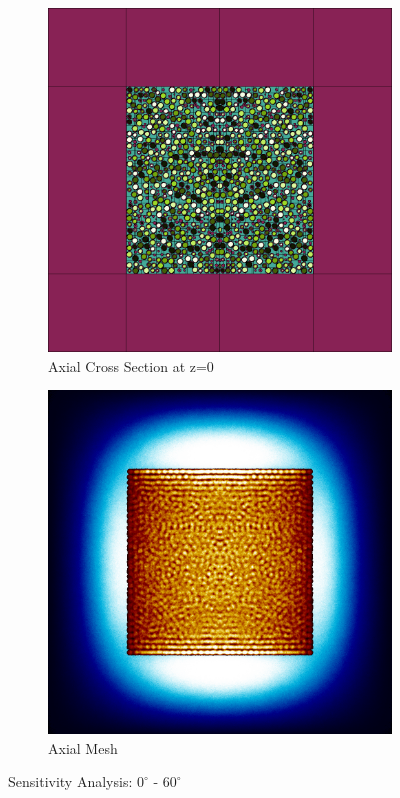 \begin{figure}[H]
\begin{subfigure}{0.45\textwidth}
  \includegraphics[width=0.95\linewidth]{figures/0-60/0-60-v}
  \caption{Axial Cross Section at z=0 }
  \label{fig:0-60-v}
\end{subfigure}
%
\begin{subfigure}{0.45\textwidth}
  \includegraphics[width=0.95\linewidth]{figures/0-60/0-60-vm}
  \caption{Axial Mesh}
  \label{fig:0-60-vm}
\end{subfigure}
%
\caption{Sensitivity Analysis: $0^{\circ}$ - $60^{\circ}$}
\label{fig:0-60}
\end{figure}